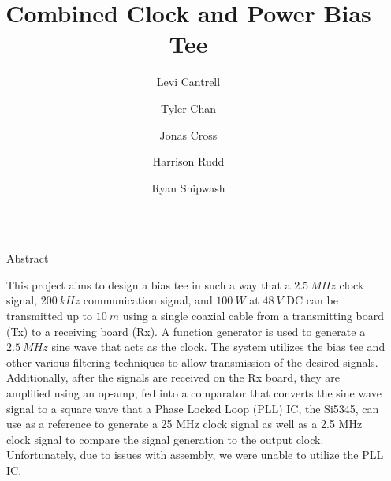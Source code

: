 \documentclass[final]{beamer}
\title{Combined Clock and Power Bias Tee}
\author{Levi Cantrell \inst{1} \and Tyler Chan \inst{2} \and Jonas Cross \inst{3} \and Harrison Rudd \inst{4} \and Ryan Shipwash \inst{5}}
\institute[shortinst]{\inst{1} Tennessee Technological University \samelineand \inst{2} Siemens Healthineers}
\newlength{\sepwidth}
\newlength{\colwidth}
\newcommand{\separatorcolumn}{\begin{column}{\sepwidth}\end{column}}
\begin{document}
\begin{frame}[t]
\begin{columns}[t]
\separatorcolumn

\begin{column}{\colwidth}

  \begin{block}{Abstract}

    This project aims to design a bias tee in such a way that a $2.5\ MHz$ clock signal, $200\ kHz$ communication signal, and $100\ W$ at $48\ V$ DC can be transmitted up to $10\ m$ using a single coaxial cable from a transmitting board (Tx) to a receiving board (Rx). A function generator is used to generate a $2.5\ MHz$ sine wave that acts as the clock. The system utilizes the bias tee and other various filtering techniques to allow transmission of the desired signals. Additionally, after the signals are received on the Rx board, they are amplified using an op-amp, fed into a comparator that converts the sine wave signal to a square wave that a Phase Locked Loop (PLL) IC, the Si5345, can use as a reference to generate a 25 MHz clock signal as well as a 2.5 MHz clock signal to compare the signal generation to the output clock. Unfortunately, due to issues with assembly, we were unable to utilize the PLL IC.

  \end{block}


\end{column}
\end{columns}
\end{frame}
\end{document}
